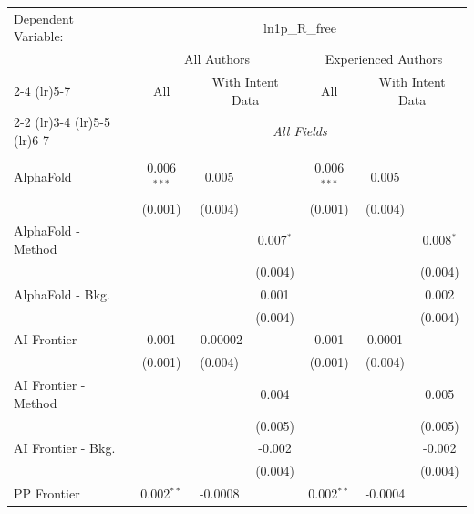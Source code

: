 \begingroup
\centering
\begin{tabular}{lcccccc}
   \tabularnewline \midrule \midrule
   Dependent Variable: & \multicolumn{6}{c}{ln1p\_R\_free}\\
 & \multicolumn{3}{c}{All Authors} & \multicolumn{3}{c}{Experienced Authors} \\
\cmidrule(lr){2-4} \cmidrule(lr){5-7}
 & \multicolumn{1}{c}{All} & \multicolumn{2}{c}{With Intent Data} & \multicolumn{1}{c}{All} & \multicolumn{2}{c}{With Intent Data} \\
\cmidrule(lr){2-2} \cmidrule(lr){3-4} \cmidrule(lr){5-5} \cmidrule(lr){6-7}
 & \multicolumn{6}{c}{\textit{All Fields}} \\ \\
   AlphaFold            & 0.006$^{***}$ & 0.005    &             & 0.006$^{***}$ & 0.005   &   \\   
                        & (0.001)       & (0.004)  &             & (0.001)       & (0.004) &   \\   
   AlphaFold - Method   &               &          & 0.007$^{*}$ &               &         & 0.008$^{*}$\\   
                        &               &          & (0.004)     &               &         & (0.004)\\   
   AlphaFold - Bkg.     &               &          & 0.001       &               &         & 0.002\\   
                        &               &          & (0.004)     &               &         & (0.004)\\   
   AI Frontier          & 0.001         & -0.00002 &             & 0.001         & 0.0001  &   \\   
                        & (0.001)       & (0.004)  &             & (0.001)       & (0.004) &   \\   
   AI Frontier - Method &               &          & 0.004       &               &         & 0.005\\   
                        &               &          & (0.005)     &               &         & (0.005)\\   
   AI Frontier - Bkg.   &               &          & -0.002      &               &         & -0.002\\   
                        &               &          & (0.004)     &               &         & (0.004)\\   
   PP Frontier          & 0.002$^{**}$  & -0.0008  &             & 0.002$^{**}$  & -0.0004 &   \\   

\end{tabular}
